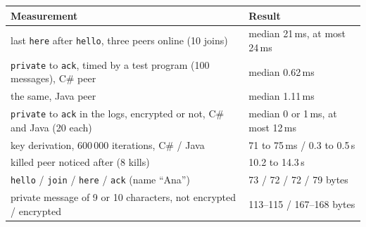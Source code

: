 \documentclass[11pt,a4paper]{article}
\newcommand{\code}[1]{{\frenchspacing\texttt{#1}}}
\begin{document}
\begin{center}
\small
\begin{tabularx}{\linewidth}{@{}Xl@{}}
\toprule
Measurement & Result \\
\midrule
last \code{here} after \code{hello}, three peers online (10 joins) & median 21\,ms, at most 24\,ms \\
\code{private} to \code{ack}, timed by a test program (100 messages), C\# peer & median 0.62\,ms \\
the same, Java peer & median 1.11\,ms \\
\code{private} to \code{ack} in the logs, encrypted or not, C\# and Java (20 each) & median 0 or 1\,ms, at most 12\,ms \\
key derivation, 600\,000 iterations, C\# / Java & 71 to 75\,ms / 0.3 to 0.5\,s \\
killed peer noticed after (8 kills) & 10.2 to 14.3\,s \\
\code{hello} / \code{join} / \code{here} / \code{ack} (name ``Ana'') & 73 / 72 / 72 / 79 bytes \\
private message of 9 or 10 characters, not encrypted / encrypted & 113--115 / 167--168 bytes \\
\bottomrule
\end{tabularx}
\end{center}
\end{document}
